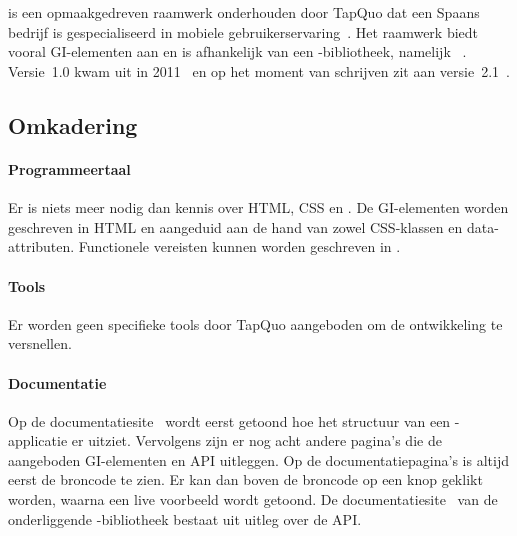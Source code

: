 
\section{\lungo}
\label{sec:raamwerk-lungo}
\lungo{} is een opmaakgedreven raamwerk onderhouden door TapQuo dat een Spaans bedrijf is gespecialiseerd in mobiele gebruikerservaring~\cite{TapQuo2013a}.
Het raamwerk biedt vooral GI-elementen aan en is afhankelijk van een \js{}-bibliotheek, namelijk \quo{}~\cite{TapQuo2013}.
Versie~1.0 kwam uit in 2011~\cite{TapQuo2011} en op het moment van schrijven zit \lungo{} aan versie~2.1~\cite{TapQuo2013}.

\subsection{Omkadering}
\paragraph{Programmeertaal}
Er is niets meer nodig dan kennis over HTML, CSS en \js{}.
De GI-elementen worden geschreven in HTML en aangeduid aan de hand van zowel CSS-klassen en data-attributen.
Functionele vereisten kunnen worden geschreven in \js{}.

\paragraph{Tools}
Er worden geen specifieke tools door TapQuo aangeboden om de ontwikkeling te versnellen.

\paragraph{Documentatie}
Op de documentatiesite~\cite{Lungo2013} wordt eerst getoond hoe het structuur van een \lungo{}-applicatie er uitziet.
Vervolgens zijn er nog acht andere pagina's die de aangeboden GI-elementen en API uitleggen.
Op de documentatiepagina's is altijd eerst de broncode te zien.
Er kan dan boven de broncode op een knop geklikt worden, waarna een live voorbeeld wordt getoond.
De documentatiesite~\cite{TapQuo2013c} van de onderliggende \js{}-bibliotheek bestaat uit uitleg over de API.

